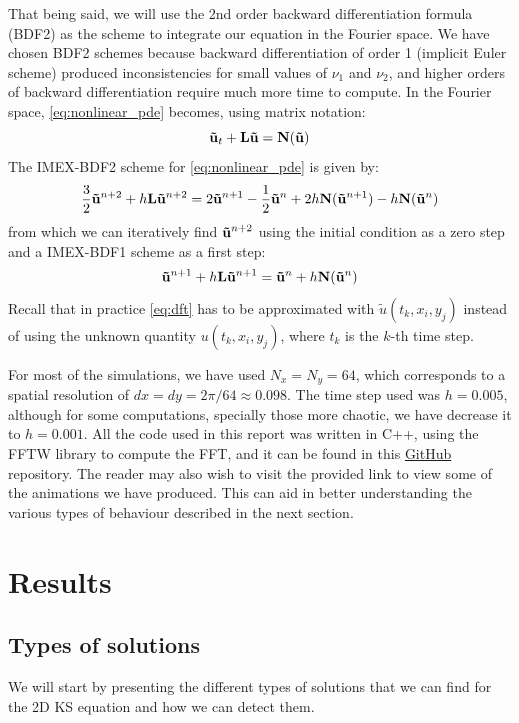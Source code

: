 \documentclass[twoside]{article}
\begin{document}
That being said, we will use the 2nd order backward differentiation formula (BDF2) as the scheme to integrate our equation in the Fourier space. We have chosen BDF2 schemes because backward differentiation of order 1 (implicit Euler scheme) produced inconsistencies for small values of $\nu_1$ and $\nu_2$, and higher orders of backward differentiation require much more time to compute. In the Fourier space, \cref{eq:nonlinear_pde} becomes, using matrix notation:
\begin{equation}
  \boldsymbol{\mathrm{\tilde{u}}}_t+\boldsymbol{\mathrm{L}}\boldsymbol{\mathrm{\tilde{u}}}=\boldsymbol{\mathrm{N}}(\boldsymbol{\mathrm{\tilde{u}}})
\end{equation}
The IMEX-BDF2 scheme for \cref{eq:nonlinear_pde} is given by:
\begin{equation}
  \frac{3}{2} \boldsymbol{\mathrm{\tilde{u}}}^{n+2} +h \boldsymbol{\mathrm{L}} \boldsymbol{\mathrm{\tilde{u}}}^{n+2} = 2 \boldsymbol{\mathrm{\tilde{u}}}^{n+1} - \frac{1}{2} \boldsymbol{\mathrm{\tilde{u}}}^{n} + 2h \boldsymbol{\mathrm{N}}(\boldsymbol{\mathrm{\tilde{u}}}^{n+1}) -  h \boldsymbol{\mathrm{N}}(\boldsymbol{\mathrm{\tilde{u}}}^{n})
\end{equation}
from which we can iteratively find $\boldsymbol{\mathrm{\tilde{u}}}^{n+2}$ using the initial condition as a zero step and a IMEX-BDF1 scheme as a first step:
\begin{equation}
  \boldsymbol{\mathrm{\tilde{u}}}^{n+1} + h \boldsymbol{\mathrm{L}} \boldsymbol{\mathrm{\tilde{u}}}^{n+1} = \boldsymbol{\mathrm{\tilde{u}}}^{n} + h \boldsymbol{\mathrm{N}}(\boldsymbol{\mathrm{\tilde{u}}}^{n})
\end{equation}
Recall that in practice \cref{eq:dft} has to be approximated with $\tilde{u}(t_k,x_i,y_j)$ instead of using the unknown quantity $u(t_k,x_i,y_j)$, where $t_k$ is the $k$-th time step.

For most of the simulations, we have used $N_x=N_y=64$, which corresponds to a spatial resolution of $dx=dy=2\pi/64\approx 0.098$. The time step used was $h=0.005$, although for some computations, specially those more chaotic, we have decrease it to $h=0.001$. All the code used in this report was written in C++, using the FFTW library \cite{fftw} to compute the FFT, and it can be found in this \href{https://github.com/victorballester7/2d-kuramoto-sivashinsky}{GitHub} repository. The reader may also wish to visit the provided link to view some of the animations we have produced. This can aid in better understanding the various types of behaviour described in the next section.

\section{Results}
\subsection{Types of solutions}\label{sec:types_of_solutions}
We will start by presenting the different types of solutions that we can find for the 2D KS equation and how we can detect them.
\end{document}
